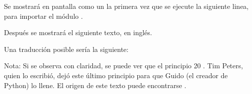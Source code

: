 Se mostrará en pantalla como un  la primera vez que se ejecute la siguiente linea, para importar el módulo .


Después se mostrará el siguiente texto, en inglés.


Una traducción posible sería la siguiente:


Nota: Si se observa con claridad, se puede ver que el principio 20 . Tim Peters, quien lo escribió, dejó este último principio para que Guido (el creador de Python) lo llene. El origen de este texto puede encontrarse .

\clearpage
